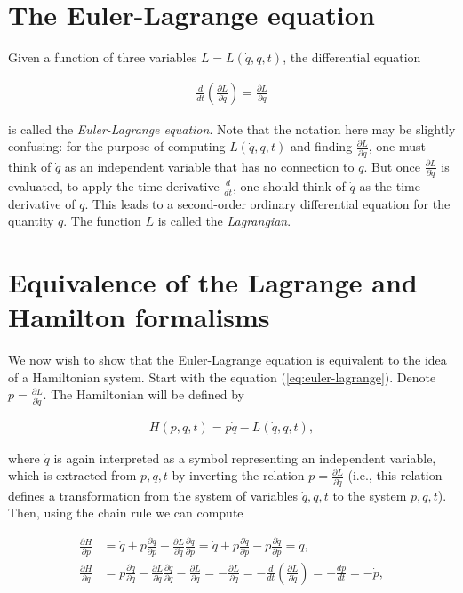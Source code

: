 \documentclass[11pt]{report}
\theoremstyle{plain}
\theoremstyle{definition}
\begin{document}
\section{The Euler-Lagrange equation}
Given a function of three variables
$L=L(\dot{q},q,t)$, the differential equation

\begin{equation*} \tag{4}\label{eq:euler-lagrange}
\begin{split}
\frac{d}{dt}\left( \frac{\partial L}{\partial \dot{q}} \right) = \frac{\partial L}{\partial q}
\end{split}
\end{equation*}

is called the \emph{Euler-Lagrange equation}. Note that
the notation here may be slightly confusing: for the
purpose of computing $L(\dot{q},q,t)$ and finding
$\frac{\partial L}{\partial \dot{q}}$, one must think
of $\dot{q}$ as an independent variable that has no
connection to $q$. But once
$\frac{\partial L}{\partial \dot{q}}$ is evaluated,
to apply the time-derivative $\frac{d}{dt}$, one
should think of $\dot{q}$ as the time-derivative of
$q$. This leads to a second-order ordinary
differential equation for the quantity $q$. The
function $L$ is called the \emph{Lagrangian}.

\section{Equivalence of the Lagrange and Hamilton formalisms}
We now wish to show that the Euler-Lagrange equation
is equivalent to the idea of a Hamiltonian system.
Start with the equation (\ref{eq:euler-lagrange}). Denote
$p=\frac{\partial L}{\partial \dot{q}}$. The
Hamiltonian will be defined by

\begin{equation*} \tag{5}\label{eq:hamilton-lagrange}
\begin{split}
H(p,q,t) = p\dot{q} - L(\dot{q}, q, t),
\end{split}
\end{equation*}

where $\dot{q}$ is again interpreted as a symbol
representing an independent variable, which is
extracted from $p, q, t$ by inverting the relation
$p=\frac{\partial L}{\partial \dot{q}}$ (i.e., this
relation defines a transformation from the system of
variables $\dot{q},q,t$ to the system $p,q,t$). Then,
using the chain rule we can compute

\begin{align*}
\frac{\partial H}{\partial p} &= \dot{q} + p \frac{\partial \dot{q}}{\partial p} - \frac{\partial L}{\partial \dot{q}} \frac{\partial \dot{q}}{\partial p} =
\dot{q} + p \frac{\partial \dot{q}}{\partial p} - p \frac{\partial \dot{q}}{\partial p} = \dot{q}, \\
\frac{\partial H}{\partial q} &= p \frac{\partial \dot{q}}{\partial q} - \frac{\partial L}{\partial \dot{q}}\frac{\partial \dot{q}}{\partial q}-\frac{\partial L}{\partial q} = -\frac{\partial L}{\partial q} =
- \frac{d}{dt} \left( \frac{\partial L}{\partial \dot{q}}\right) = -\frac{dp}{dt} = -\dot{p},
\end{align*}
\end{document}
